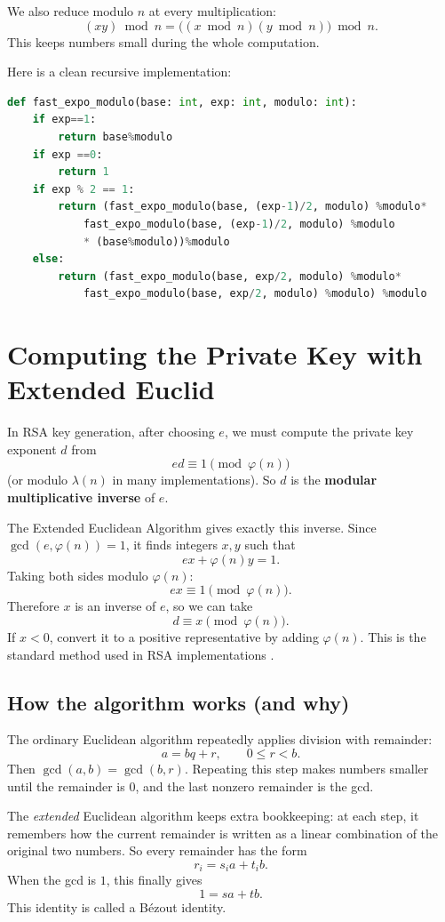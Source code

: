 We also reduce modulo \(n\) at every multiplication:
\[
  (xy)\bmod n = \bigl((x\bmod n)(y\bmod n)\bigr)\bmod n.
\]
This keeps numbers small during the whole computation.

Here is a clean recursive implementation:
\begin{lstlisting}[language=Python]
def fast_expo_modulo(base: int, exp: int, modulo: int):
    if exp==1:
        return base%modulo
    if exp ==0:
        return 1
    if exp % 2 == 1:
        return (fast_expo_modulo(base, (exp-1)/2, modulo) %modulo* 
            fast_expo_modulo(base, (exp-1)/2, modulo) %modulo 
            * (base%modulo))%modulo
    else:
        return (fast_expo_modulo(base, exp/2, modulo) %modulo* 
            fast_expo_modulo(base, exp/2, modulo) %modulo) %modulo
\end{lstlisting}

\section{Computing the Private Key with Extended Euclid}
In RSA key generation, after choosing \(e\), we must compute the private key
exponent \(d\) from
\[
  ed \equiv 1 \pmod{\varphi(n)}
\]
(or modulo \(\lambda(n)\) in many implementations). So \(d\) is the
\textbf{modular multiplicative inverse} of \(e\).

The Extended Euclidean Algorithm gives exactly this inverse. Since
\(\gcd(e,\varphi(n))=1\), it finds integers \(x,y\) such that
\[
  ex+\varphi(n)y=1.
\]
Taking both sides modulo \(\varphi(n)\):
\[
  ex \equiv 1 \pmod{\varphi(n)}.
\]
Therefore \(x\) is an inverse of \(e\), so we can take
\[
  d \equiv x \pmod{\varphi(n)}.
\]
If \(x<0\), convert it to a positive representative by adding \(\varphi(n)\).
This is the standard method used in RSA implementations \cite{wiki:rsa-cryptosystem,wiki:modular-multiplicative-inverse}.

\subsection*{How the algorithm works (and why)}
The ordinary Euclidean algorithm repeatedly applies division with remainder:
\[
a=bq+r,\qquad 0\le r<b.
\]
Then \(\gcd(a,b)=\gcd(b,r)\). Repeating this step makes numbers smaller until
the remainder is \(0\), and the last nonzero remainder is the gcd.

The \emph{extended} Euclidean algorithm keeps extra bookkeeping: at each step,
it remembers how the current remainder is written as a linear combination of
the original two numbers. So every remainder has the form
\[
r_i = s_i a + t_i b.
\]
When the gcd is \(1\), this finally gives
\[
1 = sa+tb.
\]
This identity is called a B\'{e}zout identity.

